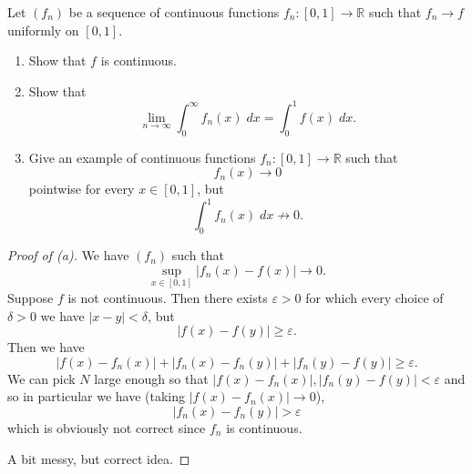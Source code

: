 \begin{prob}
    Let $(f_n)$ be a sequence of continuous functions 
    $f_n : [0,1] \to \mathbb R$ such that 
    $f_n \to f$ uniformly on $[0,1]$. 

    \begin{enumerate}[label=\alph*)]
        \item Show that $f$ is continuous. 
        \item Show that 
            \[
                \lim_{n\to\infty} \int_0^\infty f_n(x) \; dx 
                = \int_0^1 f(x) \; dx.
            \]
        \item Give an example of continuous functions 
            $f_n : [0,1] \to \mathbb R$ such that 
            \[
                f_n(x) \to 0
            \]
            pointwise for every $x \in [0,1]$, but 
            \[
                \int_0^1 f_n(x) \; dx \not\to 0.
            \]
    \end{enumerate}
\end{prob}
\begin{proof}[Proof of (a)]
    We have $(f_n)$ such that 
    \[
        \sup_{x\in[0,1]} |f_n(x) - f(x)| \to 0. 
    \]    
    Suppose $f$ is not continuous. Then there exists 
    $\varepsilon > 0$ for which every choice of $\delta > 0$ 
    we have $|x-y| < \delta$, but 
    \[
        |f(x) - f(y)| \geq \varepsilon. 
    \]
    Then we have 
    \[
        |f(x) - f_n(x)| + |f_n(x) - f_n(y)| + |f_n(y) - f(y)| \geq 
        \varepsilon.
    \]
    We can pick $N$ large enough so that  
    $|f(x) - f_n(x)|, |f_n(y) - f(y)| < \varepsilon$ and 
    so in particular 
    we have (taking $|f(x) - f_n(x)| \to 0$), 
    \[
        |f_n(x) - f_n(y)| > \varepsilon
    \]
    which is obviously not correct since $f_n$ is continuous. 

    A bit messy, but correct idea. 
\end{proof}

